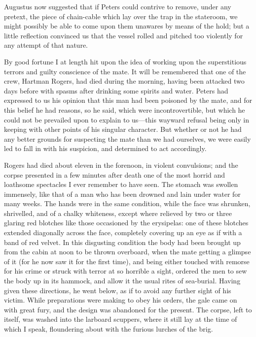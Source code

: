 Augustus now suggested that if Peters could contrive to remove, under any
pretext, the piece of chain-cable which lay over the trap in the stateroom, we
might possibly be able to come upon them unawares by means of the hold; but a
little reflection convinced us that the vessel rolled and pitched too violently
for any attempt of that nature. 

By good fortune I at length hit upon the idea of working upon the
superstitious terrors and guilty conscience of the mate. It will be remembered
that one of the crew, Hartman Rogers, had died during the morning, having been
attacked two days before with spasms after drinking some spirits and water.
Peters had expressed to us his opinion that this man had been poisoned by the
mate, and for this belief he had reasons, so he said, which were
incontrovertible, but which he could not be prevailed upon to explain to
us---this wayward refusal being only in keeping with other points of his
singular character. But whether or not he had any better grounds for suspecting
the mate than we had ourselves, we were easily led to fall in with his
suspicion, and determined to act accordingly. 

Rogers had died about eleven in the forenoon, in violent convulsions; and the
corpse presented in a few minutes after death one of the most horrid and
loathsome spectacles I ever remember to have seen. The stomach was swollen
immensely, like that of a man who has been drowned and lain under water for many
weeks. The hands were in the same condition, while the face was shrunken,
shrivelled, and of a chalky whiteness, except where relieved by two or three
glaring red blotches like those occasioned by the erysipelas: one of these
blotches extended diagonally across the face, completely covering up an eye as
if with a band of red velvet. In this disgusting condition the body had been
brought up from the cabin at noon to be thrown overboard, when the mate getting
a glimpse of it (for he now saw it for the first time), and being either touched
with remorse for his crime or struck with terror at so horrible a sight, ordered
the men to sew the body up in its hammock, and allow it the usual rites of
sea-burial. Having given these directions, he went below, as if to avoid any
further sight of his victim. While preparations were making to obey his orders,
the gale came on with great fury, and the design was abandoned for the present.
The corpse, left to itself, was washed into the larboard scuppers, where it
still lay at the time of which I speak, floundering about with the furious
lurches of the brig. 

